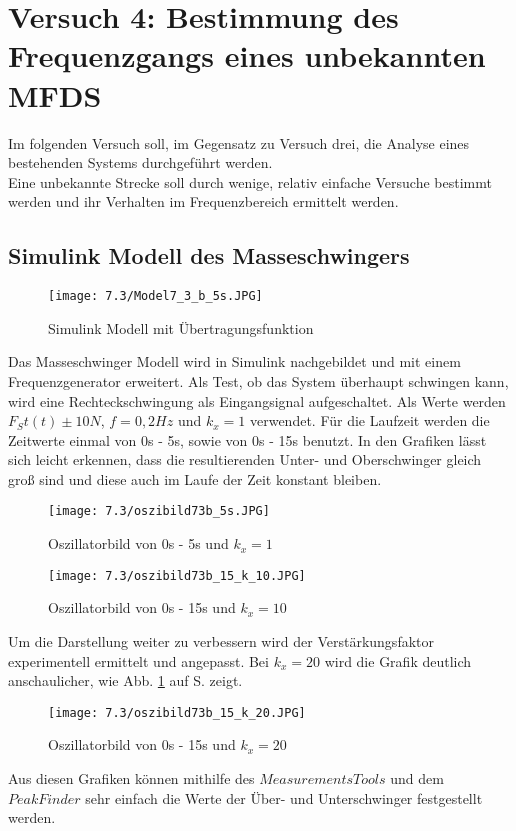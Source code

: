 \documentclass[12pt,a4paper]{scrartcl}	%
\begin{document}
\section{Versuch 4: Bestimmung des Frequenzgangs eines unbekannten MFDS}
Im folgenden Versuch soll, im Gegensatz zu Versuch drei, die Analyse eines bestehenden Systems durchgeführt werden.\\
Eine unbekannte Strecke soll durch wenige, relativ einfache Versuche bestimmt werden und ihr Verhalten im Frequenzbereich ermittelt werden.
\subsection{Simulink Modell des Masseschwingers}
\begin{figure}[tbh]
	\centering
	\texttt{[image: 7.3/Model7\_3\_b\_5s.JPG]}
	\caption{Simulink Modell mit Übertragungsfunktion}
\end{figure}
Das Masseschwinger Modell wird in Simulink nachgebildet und mit einem Frequenzgenerator erweitert.
Als Test, ob das System überhaupt schwingen kann, wird eine Rechteckschwingung als Eingangsignal aufgeschaltet. Als Werte werden $F_St(t) \pm 10N$, $f=0,2Hz$ und $k_x=1$ verwendet. Für die Laufzeit werden die Zeitwerte einmal von 0s - 5s, sowie von 0s - 15s benutzt. In den Grafiken lässt sich leicht erkennen, dass die resultierenden Unter- und Oberschwinger gleich groß sind und diese auch im Laufe der Zeit konstant bleiben.
\begin{figure}[tbh]
	\centering
	\texttt{[image: 7.3/oszibild73b\_5s.JPG]}
	\caption{Oszillatorbild von 0s - 5s und $k_x = 1$}
\end{figure}
\begin{figure}[tbh]
	\centering
	\texttt{[image: 7.3/oszibild73b\_15\_k\_10.JPG]}
	\caption{Oszillatorbild von 0s - 15s und $k_x = 10$}
\end{figure}
Um die Darstellung weiter zu verbessern wird der Verstärkungsfaktor experimentell ermittelt und angepasst. Bei $k_x=20$ wird die Grafik deutlich anschaulicher, wie Abb. \ref{k} auf S. \pageref{k} zeigt.
\begin{figure}[tbh]
	\centering
	\texttt{[image: 7.3/oszibild73b\_15\_k\_20.JPG]}
	\caption{Oszillatorbild von 0s - 15s und $k_x = 20$}
	\label{k}
\end{figure}
Aus diesen Grafiken können mithilfe des $Measurements Tools$ und dem $Peak Finder$ sehr einfach die Werte der Über- und Unterschwinger festgestellt werden.
\clearpage
\end{document}
